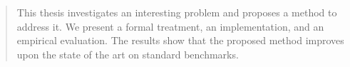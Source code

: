 \begin{abstract}
This thesis investigates an interesting problem and proposes a method to
address it. We present a formal treatment, an implementation, and an
empirical evaluation. The results show that the proposed method improves
upon the state of the art on standard benchmarks.
\end{abstract}